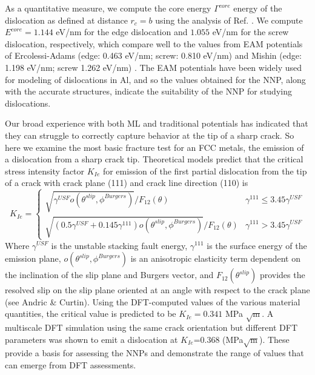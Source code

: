 \documentclass{article}
\begin{document}
As a quantitative measure, we compute the core energy $\Gamma^{core}$ energy of the dislocation as defined at distance $r_c = b$ using the analysis of Ref. \cite{Hu2020AtomisticDynamics}.
We compute $E^{core}=1.144$ eV/nm for the edge dislocation and $1.055$ eV/nm for the screw dislocation, respectively, which compare well to the values from EAM potentials of Ercolessi-Adams\cite{Ercolesi1994InteratomicMethod} (edge: 0.463 eV/nm; screw: 0.810 eV/nm) and Mishin\cite{Mishin1999InteratomicCalculations} (edge: 1.198 eV/nm; screw 1.262 eV/nm) \cite{Hu2020AtomisticDynamics}.  The EAM potentials have been widely used for modeling of dislocations in Al, and so the values obtained for the NNP, along with the accurate structures, indicate the suitability of the NNP for studying dislocations.

Our broad experience with both ML and traditional potentials has indicated that they can struggle to correctly capture behavior at the tip of a sharp crack. 
So here we examine the most basic fracture test for an FCC metals, the emission of a dislocation from a sharp crack tip.
Theoretical models predict that the critical stress intensity factor $K_{Ie}$ for emission of the first partial dislocation from the tip of a crack with crack plane (111) and crack line direction (110) is
\begin{equation}
K_{Ie} =
\begin{cases}
\sqrt{\gamma^{USF}o(\theta^{slip},\phi^{Burgers})}/F_{12}(\theta) & \gamma^{111} \leq 3.45\gamma^{USF}\\
 \sqrt{(0.5\gamma^{USF}+0.145\gamma^{111})o(\theta^{slip},\phi^{Burgers})}/F_{12}(\theta) & \gamma^{111} > 3.45\gamma^{USF}
\end{cases}
\end{equation}
Where $\gamma^{USF}$ is the unstable stacking fault energy, $\gamma^{111}$  is the surface energy of the emission plane, $o(\theta^{slip},\phi^{Burgers})$ is an anisotropic elasticity term dependent on the inclination of the slip plane and Burgers vector, and $F_{12}(\theta^{slip})$ provides the resolved slip on the slip plane oriented at an angle with respect to the crack plane (see Andric \& Curtin\cite{Andric2019AtomisticFracture}).  Using the DFT-computed values of the various material quantities, the critical value is predicted to be $K_{Ie}=0.341$ MPa $\sqrt{\text{m}}$.  A multiscale DFT simulation using the same crack orientation but different DFT parameters\cite{Nair2011} was shown to emit a dislocation at $K_{Ie}$=0.368 (MPa$\sqrt{\text{m}}$).  These provide a basis for assessing the NNPs and demonstrate the range of values that can emerge from DFT assessments.
\end{document}
